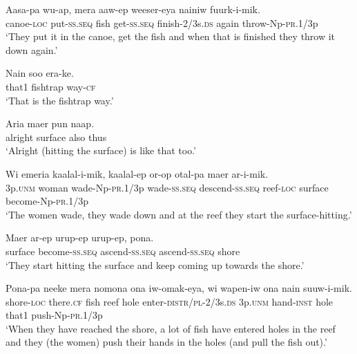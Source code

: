 {\ea\label{ex:a:x23}
\gll  Aasa-pa  wu-ap,  mera  aaw-ep  weeser-eya           nainiw  fuurk-i-mik. \\
canoe-\textsc{loc}  put-\textsc{ss.seq}  fish  get-\textsc{ss.seq}  finish-2/3s.\textsc{ds}   again  throw-Np-\textsc{pr}.1/3p \\


\glt ‘They put it in the canoe, get the fish and when that is finished they throw it down again.’ \\
\z


\ea\label{ex:a:x24}
\gll  Nain  soo  era-ke. \\
that1  fishtrap  way-\textsc{cf} \\
\glt ‘That is the fishtrap way.’ \\
\z


\ea\label{ex:a:x25}
\gll  Aria  maer  pun  naap. \\
alright  surface  also  thus \\
\glt ‘Alright (hitting the surface) is like that too.’ \\
\z


\ea\label{ex:a:x26}
\gll  Wi  emeria  kaalal-i-mik,  kaalal-ep     or-op  otal-pa  maer  ar-i-mik. \\
3p.\textsc{unm}  woman  wade{}-Np-\textsc{pr}.1/3p  wade-\textsc{ss.seq}  descend-\textsc{ss.seq}  reef-\textsc{loc}  surface  become-Np-\textsc{pr}.1/3p \\


\glt ‘The women wade, they wade down and at the reef they start the surface-hitting.’ \\
\z


\ea\label{ex:a:x27}
\gll  Maer  ar-ep  urup-ep  urup-ep,  pona. \\
surface  become-\textsc{ss.seq}  ascend-\textsc{ss.seq}  ascend-\textsc{ss.seq}  shore \\
\glt ‘They start hitting the surface and keep coming up towards the shore.’ \\
\z


\ea\label{ex:a:x28}
\gll  Pona-pa  neeke  mera  nomona  ona  iw-omak-eya,          wi  wapen-iw  ona  nain  suuw-i-mik. \\
shore-\textsc{loc}  there.\textsc{cf}  fish  reef  hole  enter-\textsc{distr}/\textsc{pl}-2/3s.\textsc{ds}  3p.\textsc{unm}  hand-\textsc{inst}  hole  that1  push{}-Np-\textsc{pr}.1/3p \\


\glt ‘When they have reached the shore, a lot of fish have entered holes in the reef and they (the women) push their hands in the holes (and pull the fish out).’ \\
\z


}
